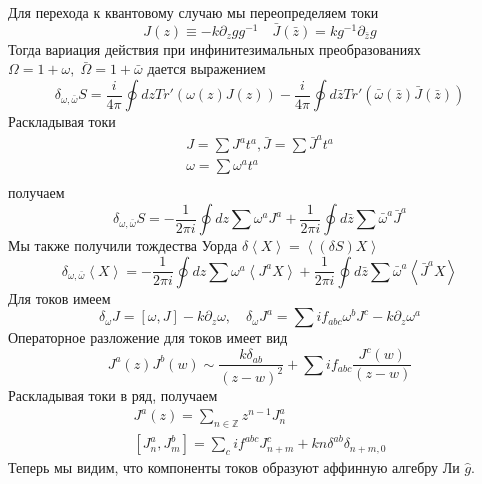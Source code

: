 \documentclass[a4paper,12pt]{article}
\theoremstyle{definition} \newtheorem{Def}{Definition}
\begin{document}
Для перехода к квантовому случаю мы переопределяем токи
\begin{equation}
  \label{eq:82}
  J(z)\equiv -k \partial_zg g^{-1}\quad \bar J(\bar z)=k g^{-1}\partial_{\bar z}g
\end{equation}
Тогда вариация действия при инфинитезимальных преобразованиях $\Omega=1+\omega,\; \bar \Omega =1+\bar \omega$ дается выражением
\begin{equation}
  \label{eq:83}
  \delta_{\omega,\bar\omega}S=\frac{i}{4\pi}\oint dz Tr' (\omega(z)J(z))-\frac{i}{4\pi}\oint d\bar z Tr'(\bar\omega(\bar z)\bar J(\bar z))
\end{equation}
Раскладывая токи
\begin{equation}
  \label{eq:85}
  \begin{aligned}
    J=\sum J^a t^a,\bar J=\sum \bar J^a t^a \\
    \omega=\sum \omega^a t^a\\
  \end{aligned}
\end{equation}
получаем
\begin{equation}
  \label{eq:86}
  \delta_{\omega,\bar \omega}S=-\frac{1}{2\pi i}\oint dz \sum\omega^a J^a+\frac{1}{2\pi i} \oint d\bar z \sum \bar \omega^a \bar J^a
\end{equation}
Мы также получили тождества Уорда $\delta\left< X\right>=\left<(\delta S)X\right>$
\begin{equation}
  \label{eq:87}
  \delta_{\omega,\bar \omega}\left< X \right>=-\frac{1}{2\pi i}\oint dz \sum\omega^a \left< J^a X\right>+
  \frac{1}{2\pi i} \oint d\bar z \sum \bar \omega^a \left< \bar J^a X\right>
\end{equation}
Для токов имеем
\begin{equation}
  \label{eq:88}
  \delta_{\omega}J=[\omega,J]-k\partial_z\omega,\quad \delta_{\omega}J^a=\sum i f_{abc}\omega^b J^c-k\partial_z\omega^a
\end{equation}
Операторное разложение для токов имеет вид
\begin{equation}
  \label{eq:89}
  J^a(z) J^b(w) \sim \frac{k\delta_{ab}}{(z-w)^2}+\sum i f_{abc}\frac{J^c(w)}{(z-w)}
\end{equation}
Раскладывая токи в ряд, получаем
\begin{equation}
  \label{eq:90}
  \begin{aligned}
    J^a(z)=\sum_{n\in \mathbb Z}z^{n-1}J^a_n\\
    \left[J^a_n,J^b_m\right]=\sum_c i f^{abc}J^c_{n+m}+kn\delta^{ab}\delta_{n+m,0}
  \end{aligned}
\end{equation}
Теперь мы видим, что компоненты токов образуют аффинную алгебру Ли $\hat g$.
\end{document}

